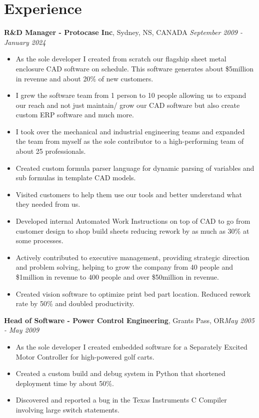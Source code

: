\documentclass[letter,11pt]{article}
\begin{document}
\section*{Experience}
\noindent
\textbf{R\&D Manager - Protocase Inc}, Sydney, NS, CANADA \hfill \textit{September 2009 - January 2024}
\begin{itemize}[leftmargin=*,itemsep=0pt, parsep=0pt,label=$\diamond$]
\item As the sole developer I created from scratch our flagship sheet metal enclosure CAD software on schedule. This software generates about \$5million in revenue and about 20\% of new customers.
\item I grew the software team from 1 person to 10 people allowing us to expand our reach and not just maintain/ grow our CAD software but also create custom ERP software and much more.
\item I took over the mechanical and industrial engineering teams and expanded the team from myself as the sole contributor to a high-performing team of about 25 professionals.
\item Created custom formula parser language for dynamic parsing of variables and sub formulas in template CAD models. 
\item Visited customers to help them use our tools and better understand what they needed from us.
\item Developed internal Automated Work Instructions on top of CAD to go from customer design to shop build sheets reducing rework by as much as 30\% at some processes.
\item Actively contributed to executive management, providing strategic direction and problem solving, helping to grow the company from 40 people and \$1million in revenue to 400 people and over \$50million in revenue.
\item Created vision software to optimize print bed part location. Reduced rework rate by 50\% and doubled productivity.
\end{itemize}

\noindent
\textbf{Head of Software - Power Control Engineering}, Grants Pass, OR\hfill \textit{May 2005 - May 2009}
\begin{itemize}[leftmargin=*,itemsep=0pt, parsep=0pt,label=$\diamond$]
\item As the sole developer I created embedded software for a Separately Excited Motor Controller for high-powered golf carts.
\item Created a custom build and debug system in Python that shortened deployment time by about 50\%.
\item Discovered and reported a bug in the Texas Instruments C Compiler involving large switch statements.
\end{itemize}
\end{document}
